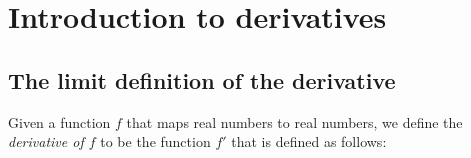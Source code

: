 \newpage

\section*{Introduction to derivatives}

\subsection*{The limit definition of the derivative}

Given a function $f$ that maps real numbers to real numbers, we define the \textit{derivative of $f$} to be the function $f'$ that is defined as follows:
     
